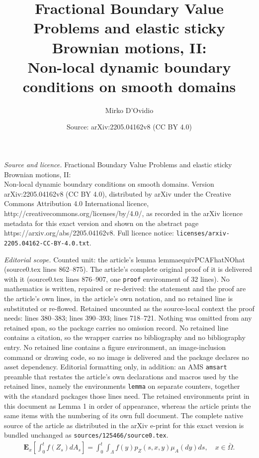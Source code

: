 \documentclass[10pt,a4paper]{amsart}
\title{\Large Fractional Boundary Value Problems and elastic sticky Brownian motions, II:\\ Non-local dynamic boundary conditions on smooth domains}
\author{Mirko D'Ovidio}
\date{Source: arXiv:2205.04162v8 (CC BY 4.0)}
\begin{document}
\maketitle

\noindent\emph{Source and licence.} \Large Fractional Boundary Value Problems and elastic sticky Brownian motions, II:\\ Non-local dynamic boundary conditions on smooth domains. Version arXiv:2205.04162v8 (CC BY 4.0), distributed by arXiv under the Creative Commons Attribution 4.0 International licence, http://creativecommons.org/licenses/by/4.0/, as recorded in the arXiv licence metadata for this exact version and shown on the abstract page https://arxiv.org/abs/2205.04162v8. Full licence notice: \texttt{licenses/arxiv-2205.04162-CC-BY-4.0.txt}.\par\smallskip

\noindent\textit{Editorial scope.} Counted unit: the article's lemma lemmaequivPCAFhatNOhat (source0.tex lines 862--875). The article's complete original proof of it is delivered with it (source0.tex lines 876--907, one \texttt{proof} environment of 32 lines). No mathematics is written, repaired or re-derived: the statement and the proof are the article's own lines, in the article's own notation, and no retained line is substituted or re-flowed.  Retained uncounted as the source-local context the proof needs: lines 380--383; lines 390--393; lines 718--721.  Nothing was omitted from any retained span, so the package carries no omission record.  No retained line contains a citation, so the wrapper carries no bibliography and no bibliography entry.  No retained line contains a figure environment, an image-inclusion command or drawing code, so no image is delivered and the package declares no asset dependency.  Editorial formatting only, in addition: an AMS \texttt{amsart} preamble that restates the article's own declarations and macros used by the retained lines, namely the environments \texttt{lemma} on separate counters, together with the standard packages those lines need.  The retained environments print in this document as Lemma 1 in order of appearance, whereas the article prints the same items with the numbering of its own full document.  The complete native source of the article as distributed in the arXiv e-print for this exact version is bundled unchanged as \texttt{sources/125466/source0.tex}.
\begin{align}
\label{INTmuA}
\mathbf{E}_x \left[ \int_0^t f(Z_s)dA_s \right] = \int_0^t \int_\Lambda f(y) p_Z(s,x,y) \mu_A(dy) ds, \quad x \in \bar{\Omega}.
\end{align}
\end{document}
